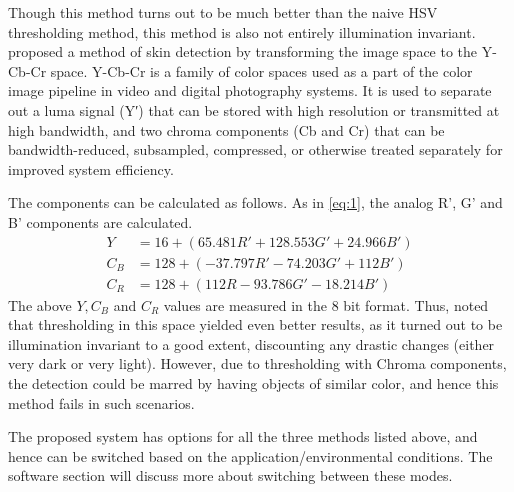\documentclass[letterpaper, 10 pt, twoside, conference]{ieeeconf}
\begin{document}
Though this method turns out to be much better than the naive HSV thresholding method, this method is
also not entirely illumination invariant. \cite{Chai1999} proposed a method of skin detection by transforming
the image space to the Y-Cb-Cr space. Y-Cb-Cr is a family of color spaces used as a part of the color image
pipeline in video and digital photography systems. It is used to separate out a luma signal (Y′) that can be 
stored with high resolution or transmitted at high bandwidth, and two chroma components (Cb and Cr) 
that can be bandwidth-reduced, subsampled, compressed, or otherwise treated separately for improved system efficiency.

The components can be calculated as follows. As in \ref{eq:1}, the analog R', G' and B' components are calculated.
\[
  \begin{split}
    Y &= 16 + (65.481R' + 128.553G' + 24.966B')
    \\
    C_B &= 128 + (-37.797R' - 74.203G' + 112B')
    \\
    C_R &= 128 + (112R - 93.786G' - 18.214B')
  \end{split}
\]
The above $Y,C_B$ and $C_R$ values are measured in the 8 bit format. Thus, \cite{Chai1999} noted that thresholding
in this space yielded even better results, as it turned out to be illumination invariant to a good extent,
discounting any drastic changes (either very dark or very light). However, due to thresholding with Chroma
components, the detection could be marred by having objects of similar color, and hence this method fails
in such scenarios.

The proposed system has options for all the three methods listed above, and hence can be switched based
on the application/environmental conditions. The software section will discuss more about switching between these modes.
\end{document}
